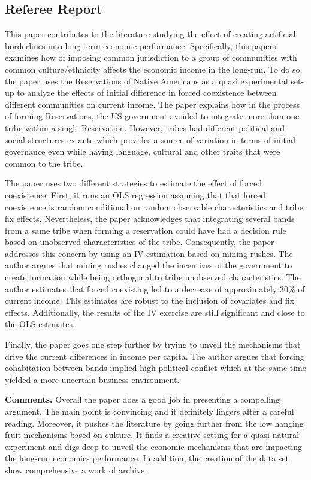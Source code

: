 \documentclass[12pt]{article}
\begin{document}
\subsection*{Referee Report}
\vspace{-10pt}
This paper contributes to the literature studying the effect of creating artificial borderlines into long term economic performance. Specifically, this papers examines how of imposing common jurisdiction to a group of communities with common culture/ethnicity affects the economic income in the long-run. To do so, the paper uses the Reservations of Native Americans as a quasi experimental set-up to analyze the effects of initial difference in forced coexistence between different communities on current income. The paper explains how in the process of forming Reservations, the US government avoided to integrate more than one tribe within a single Reservation. However, tribes had different political and social structures ex-ante which provides a source of variation in terms of initial governance even while having language, cultural and other traits that were common to the tribe. 

The paper uses two different strategies to estimate the effect of forced coexistence. First, it runs an OLS regression assuming that that forced coexistence is random conditional on random observable characteristics and tribe fix effects. Nevertheless, the paper acknowledges that integrating several bands from a same tribe when forming a reservation could have had a decision rule based on unobserved characteristics of the tribe. Consequently, the paper addresses this concern by using an IV estimation based on mining rushes. The author argues that mining rushes changed the incentives of the government to create formation while being orthogonal to tribe unobserved characteristics. The author estimates that forced coexisting led to a decrease of approximately 30\% of current income. This estimates are robust to the inclusion of covariates and fix effects. Additionally, the results of the IV exercise are still significant and close to the OLS estimates. 

Finally, the paper goes one step further by trying to unveil the mechanisms that drive the current differences in income per capita. The author argues that forcing cohabitation between bands implied high political conflict which at the same time yielded a more uncertain business environment. 

\textbf{Comments.} Overall the paper does a good job in presenting a compelling argument. The main point is convincing and it definitely lingers after a careful reading. Moreover, it pushes the literature by going further from the low hanging fruit mechanisms based on culture. It finds a creative setting for a quasi-natural experiment and digs deep to unveil the economic mechanisms that are impacting the long-run economics performance. In addition, the creation of the data set show comprehensive a work of archive.
\end{document}
